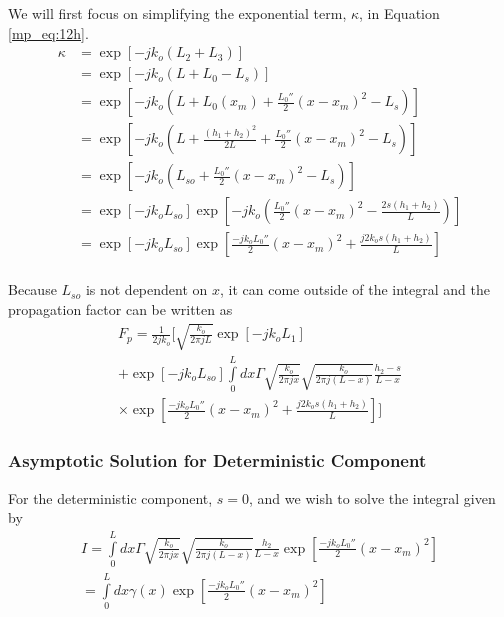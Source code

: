 We will first focus on simplifying the exponential term, $\kappa$, in Equation \ref{mp_eq:12h}.
\begin{equation}
\begin{aligned}
\kappa&= \exp\left[-jk_o\left( L_2 + L_3\right) \right] \\
&= \exp\left[-jk_o\left( L+L_0-L_s\right) \right]\\
&= \exp\left[-jk_o\left( L+L_0(x_m) + \frac{L_0''}{2}(x-x_m)^2-L_s\right) \right]\\
&= \exp\left[-jk_o\left( L+\frac{(h_1+h_2)^2}{2L} + \frac{L_0''}{2}(x-x_m)^2-L_s\right)\right]\\
&=\exp\left[-jk_o\left(L_{so}+\frac{L_0''}{2}(x-x_m)^2-L_s\right)\right]\\
&=\exp\left[-jk_oL_{so}\right]\exp\left[-jk_o\left(\frac{L_0''}{2}(x-x_m)^2-\frac{2s(h_1+h_2)}{L}\right)\right]\\
&=\exp\left[-jk_oL_{so}\right]\exp\left[\frac{-jk_oL_0''}{2}(x-x_m)^2+\frac{j2k_os(h_1+h_2)}{L}\right]\\
\label{mp_eq:12i}
\end{aligned}
\end{equation}
\renewcommand{\baselinestretch}{2} \small\normalsize

Because $L_{so}$ is not dependent on $x$, it can come outside of the integral and the propagation factor can be written as
\begin{equation}
\begin{gathered}
F_p= \frac{1}{2jk_o}\Biggl[\sqrt{\frac{k_o}{2\pi jL}}\exp\left[-jk_oL_1 \right]\\+ \exp\left[-jk_oL_{so}\right]\int\limits_{0}^{L}dx\Gamma \sqrt{\frac{k_o}{2\pi jx}}\sqrt{\frac{k_o}{2\pi j (L-x)}}\frac{h_2-s}{L-x}\\ \times\exp\left[\frac{-jk_oL_0''}{2}(x-x_m)^2+\frac{j2k_os(h_1+h_2)}{L}\right]\Biggr]
\label{mp_eq:21}
\end{gathered}
\end{equation}
\renewcommand{\baselinestretch}{2} \small\normalsize

\subsubsection{Asymptotic Solution for Deterministic Component}
For the deterministic component, $s = 0$, and we wish to solve the integral given by
\begin{equation}
\begin{gathered}
I = \int\limits_{0}^{L}dx\Gamma \sqrt{\frac{k_o}{2\pi jx}}\sqrt{\frac{k_o}{2\pi j (L-x)}}\frac{h_2}{L-x}\exp\left[\frac{-jk_oL_0''}{2}(x-x_m)^2\right] \\
= \int\limits_{0}^{L}dx\gamma(x)\exp\left[\frac{-jk_oL_0''}{2}(x-x_m)^2\right] \\
\end{gathered}
\label{mp_eq:22}
\end{equation}

